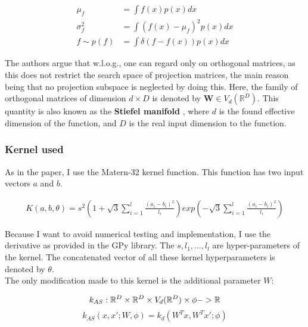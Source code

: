\begin{align}
\mu_f &= \int f(x) p(x) dx \\
\sigma^2_f &= \int ( f(x) - \mu_f )^2 p(x) dx \\
f \sim p(f) &= \int \delta( f - f(x) ) p(x) dx
\end{align}

The authors argue that w.l.o.g., one can regard only on orthogonal matrices, as this does not restrict the search space of projection matrices, the main reason being that no projection subspace is neglected by doing this.
Here, the family of orthogonal matrices of dimension $d \times D$ is denoted by $\mathbf{W} \in V_d(\mathbb{R}^D) $.
This quantity is also known as the \textbf{Stiefel manifold} \citep{StiefelBayesianInference} \citep{StatisticsStiefelIntro} \citep{StiefelNonparametric}, where $d$ is the found effective dimension of the function, and $D$ is the real input dimension to the function. \\

\subsubsection{Kernel used}
As in the paper, I use the Matern-32 kernel function.
This function has two input vectors $a$ and $b$.

\begin{align}
K(a,  b, \theta) = s^2 \left( 1 + \sqrt{3} \sum_{i=1}^l \frac{(a_i - b_i)^2}{ \textit{l}_i} \right) exp\left( - \sqrt{3} \sum_{i=1}^l \frac{(a_i - b_i)^2}{ \textit{l}_i} \right)
\end{align}

Because I want to avoid numerical testing and implementation, I use the derivative as provided in the GPy library.
The $s, l_1, \ldots, l_l $ are hyper-parameters of the kernel. 
The concatenated vector of all these kernel hyperparameters is denoted by $\theta$. \\

The only modification made to this kernel is the additional parameter $W$:

\begin{equation}
k_{AS} : \mathbb{R}^D \times \mathbb{R}^D \times V_d(\mathbb{R}^D) \times \phi -> \mathbb{R} \\
\end{equation}
\begin{equation}
k_{AS} (x, x'; W, \phi) = k_d(W^T x, W^T x'; \phi)
\end{equation}


